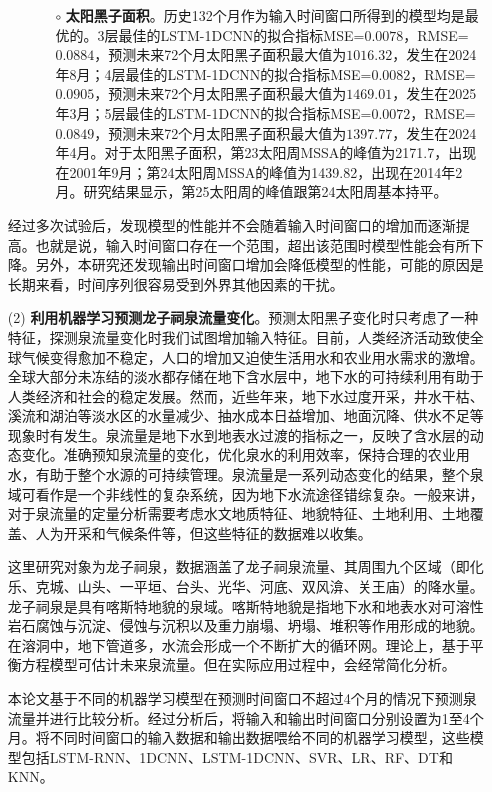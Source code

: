 \begin{enumerate}
\begin{itemize}
\begin{itemize}
      \item[$\circ$] \textbf{太阳黑子面积}。历史132个月作为输入时间窗口所得到的模型均是最优的。3层最佳的LSTM-1DCNN的拟合指标MSE=$0.0078$，RMSE=$0.0884$，预测未来72个月太阳黑子面积最大值为$1016.32$，发生在2024年8月；4层最佳的LSTM-1DCNN的拟合指标MSE=$0.0082$，RMSE=$0.0905$，预测未来72个月太阳黑子面积最大值为$1469.01$，发生在2025年3月；5层最佳的LSTM-1DCNN的拟合指标MSE=$0.0072$，RMSE=$0.0849$，预测未来72个月太阳黑子面积最大值为$1397.77$，发生在2024年4月。对于太阳黑子面积，第23太阳周MSSA的峰值为2171.7，出现在2001年9月；第24太阳周MSSA的峰值为1439.82，出现在2014年2月。研究结果显示，第25太阳周的峰值跟第24太阳周基本持平。 
    \end{itemize}
  \end{itemize}
  经过多次试验后，发现模型的性能并不会随着输入时间窗口的增加而逐渐提高。也就是说，输入时间窗口存在一个范围，超出该范围时模型性能会有所下降。另外，本研究还发现输出时间窗口增加会降低模型的性能，可能的原因是长期来看，时间序列很容易受到外界其他因素的干扰。

  \item[(2)] \textbf{利用机器学习预测龙子祠泉流量变化}。预测太阳黑子变化时只考虑了一种特征，探测泉流量变化时我们试图增加输入特征。目前，人类经济活动致使全球气候变得愈加不稳定，人口的增加又迫使生活用水和农业用水需求的激增。全球大部分未冻结的淡水都存储在地下含水层中，地下水的可持续利用有助于人类经济和社会的稳定发展。然而，近些年来，地下水过度开采，井水干枯、溪流和湖泊等淡水区的水量减少、抽水成本日益增加、地面沉降、供水不足等现象时有发生。泉流量是地下水到地表水过渡的指标之一，反映了含水层的动态变化。准确预知泉流量的变化，优化泉水的利用效率，保持合理的农业用水，有助于整个水源的可持续管理。泉流量是一系列动态变化的结果，整个泉域可看作是一个非线性的复杂系统，因为地下水流途径错综复杂。一般来讲，对于泉流量的定量分析需要考虑水文地质特征、地貌特征、土地利用、土地覆盖、人为开采和气候条件等，但这些特征的数据难以收集。
  
  这里研究对象为龙子祠泉，数据涵盖了龙子祠泉流量、其周围九个区域（即化乐、克城、山头、一平垣、台头、光华、河底、双风渰、关王庙）的降水量。龙子祠泉是具有喀斯特地貌的泉域。喀斯特地貌是指地下水和地表水对可溶性岩石腐蚀与沉淀、侵蚀与沉积以及重力崩塌、坍塌、堆积等作用形成的地貌。在溶洞中，地下管道多，水流会形成一个不断扩大的循环网。理论上，基于平衡方程模型可估计未来泉流量。但在实际应用过程中，会经常简化分析。
      
  本论文基于不同的机器学习模型在预测时间窗口不超过4个月的情况下预测泉流量并进行比较分析。经过分析后，将输入和输出时间窗口分别设置为1至4个月。将不同时间窗口的输入数据和输出数据喂给不同的机器学习模型，这些模型包括LSTM-RNN、1DCNN、LSTM-1DCNN、SVR、LR、RF、DT和KNN。
  

\end{enumerate}
